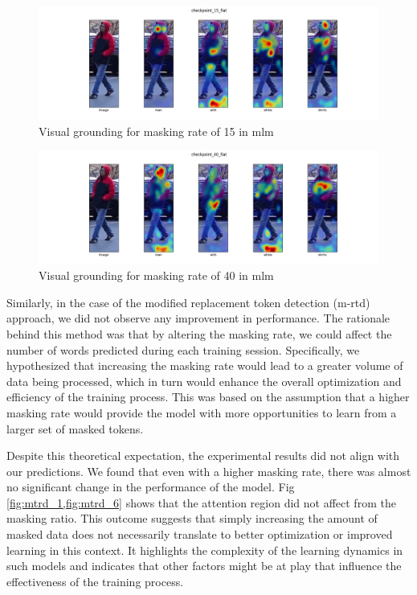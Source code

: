 \begin{figure}[htbp]
  \includegraphics[width=\linewidth]{img/mlm2/mlm-checkpoint_15_flat.png}
  \caption{Visual grounding for masking rate of 15 in \acrshort{mlm}}
  \label{fig:mlm_1}
\end{figure}

\begin{figure}[htbp]
  \includegraphics[width=\linewidth]{img/mlm2/mlm-checkpoint_40_flat.png}
  \caption{Visual grounding for masking rate of 40 in \acrshort{mlm}}
  \label{fig:mlm_6}
\end{figure}

Similarly, in the case of the modified replacement token detection (m-rtd) approach, we did not observe any improvement in performance. The rationale behind this method was that by altering the masking rate, we could affect the number of words predicted during each training session. Specifically, we hypothesized that increasing the masking rate would lead to a greater volume of data being processed, which in turn would enhance the overall optimization and efficiency of the training process. This was based on the assumption that a higher masking rate would provide the model with more opportunities to learn from a larger set of masked tokens.

Despite this theoretical expectation, the experimental results did not align with our predictions. We found that even with a higher masking rate, there was almost no significant change in the performance of the model. Fig \ref{fig:mtrd_1,fig:mtrd_6} shows that the attention region did not affect from the masking ratio. This outcome suggests that simply increasing the amount of masked data does not necessarily translate to better optimization or improved learning in this context. It highlights the complexity of the learning dynamics in such models and indicates that other factors might be at play that influence the effectiveness of the training process.


